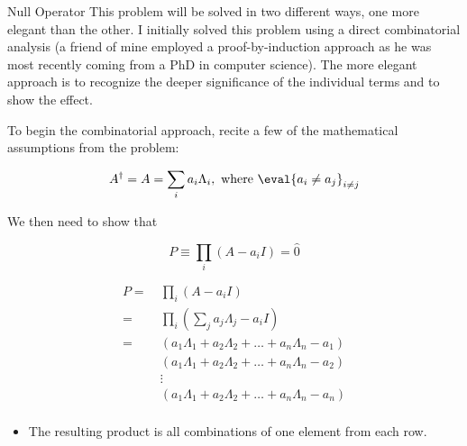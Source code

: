 \begin{answer}



\begin{answerpart}{Null Operator}
  This problem will be solved in two different ways, one more elegant
  than the other.  I initially solved this problem using a direct
  combinatorial analysis (a friend of mine employed a
  proof-by-induction approach as he was most recently coming from a
  PhD in computer science).  The more elegant approach is to recognize
  the deeper significance of the individual terms and to show the
  effect.

  To begin the combinatorial approach, recite a few of the
  mathematical assumptions from the problem:

  \begin{equation}
    A^\dagger = A = \sum_i a_i\Lambda_i, \text{ where } \eval{a_i \ne a_j}_{i \ne j}
  \end{equation}

  We then need to show that

  \begin{equation}
    P \equiv \prod_i(A - a_iI) = \hat{0}
  \end{equation}

  \begin{equation}
    \begin{split}
      P
      =\ &\prod_i(A - a_iI)\\
      =\ &\prod_i(\sum_ja_j\Lambda_j - a_iI)\\
      =\ 
      &(a_1\Lambda_1 + a_2\Lambda_2 + \ldots + a_n\Lambda_n - a_1)\\
      &(a_1\Lambda_1 + a_2\Lambda_2 + \ldots + a_n\Lambda_n - a_2)\\
      &\vdots\\
      &(a_1\Lambda_1 + a_2\Lambda_2 + \ldots + a_n\Lambda_n - a_n)\\
    \end{split}
  \end{equation}

  \begin{itemize}

  \item The resulting product is all combinations of one element from each row.


\end{itemize}
\end{answerpart}
\end{answer}
